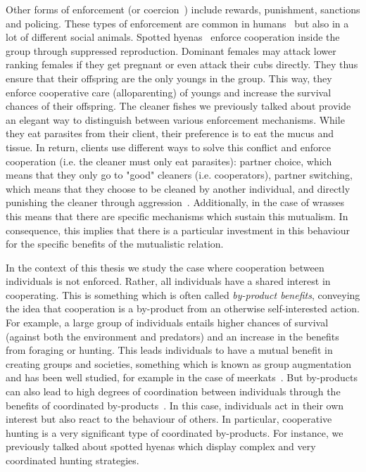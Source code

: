     Other forms of enforcement (or coercion~\parencite{Clutton-Brock2002}) include rewards, punishment, sanctions and policing. These types of enforcement are common in humans~\parencite{Fehr2002} but also in a lot of different social animals. Spotted hyenas~\parencite{Drea2003, Drea2009a, Smith2012a} enforce cooperation inside the group through suppressed reproduction. Dominant females may attack lower ranking females if they get pregnant or even attack their cubs directly. They thus ensure that their offspring are the only youngs in the group. This way, they enforce cooperative care (alloparenting) of youngs and increase the survival chances of their offspring. The cleaner fishes we previously talked about provide an elegant way to distinguish between various enforcement mechanisms. While they eat parasites from their client, their preference is to eat the mucus and tissue. In return, clients use different ways to solve this conflict and enforce cooperation (i.e. the cleaner must only eat parasites): partner choice, which means that they only go to "good" cleaners (i.e. cooperators), partner switching, which means that they choose to be cleaned by another individual, and directly punishing the cleaner through aggression~\parencite{Bshary2005}. Additionally, in the case of wrasses this means that there are specific mechanisms which sustain this mutualism. In consequence, this implies that there is a particular investment in this behaviour for the specific benefits of the mutualistic relation.


    In the context of this thesis we study the case where cooperation between individuals is not enforced. Rather, all individuals have a shared interest in cooperating. This is something which is often called \emph{by-product benefits}, conveying the idea that cooperation is a by-product from an otherwise self-interested action. For example, a large group of individuals entails higher chances of survival (against both the environment and predators) and an increase in the benefits from foraging or hunting. This leads individuals to have a mutual benefit in creating groups and societies, something which is known as group augmentation~\parencite{Bergmuller2007a} and has been well studied, for example in the case of meerkats~\parencite{Clutton-Brock2002}. But by-products can also lead to high degrees of coordination between individuals through the benefits of coordinated by-products~\parencite{Leimar2003}. In this case, individuals act in their own interest but also react to the behaviour of others. In particular, cooperative hunting is a very significant type of coordinated by-products. For instance, we previously talked about spotted hyenas which display complex and very coordinated hunting strategies.

